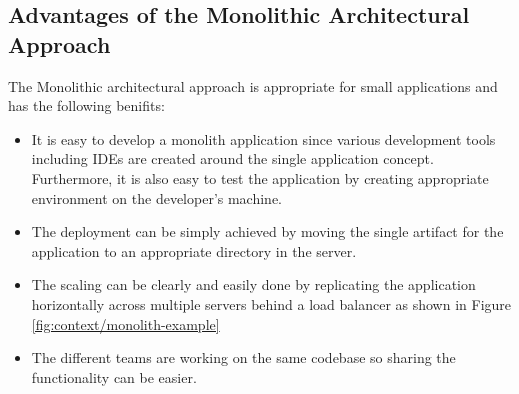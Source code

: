 \subsection{Advantages of the Monolithic Architectural Approach}\label{subsection:context/monolith-advantages}
The Monolithic architectural approach is appropriate for small applications and has the following benifits:\cite{Richardson:2014ab}\cite{Fowler:2014aa}\cite{Gupta:2015aa}\cite{Abram:2014aa}
\begin{itemize}[leftmargin=.5in]
\item It is easy to develop a monolith application since various development tools including \acrshort{IDE}s are created around the single application concept. Furthermore, it is also easy to test the application by creating appropriate environment on the developer's machine.
\item The deployment can be simply achieved by moving the single artifact for the application to an appropriate directory in the server.
\item The scaling can be clearly and easily done by replicating the application horizontally across multiple servers behind a load balancer as shown in Figure \ref{fig:context/monolith-example}
\item The different teams are working on the same codebase so sharing the functionality can be easier.
\end{itemize}
\\

